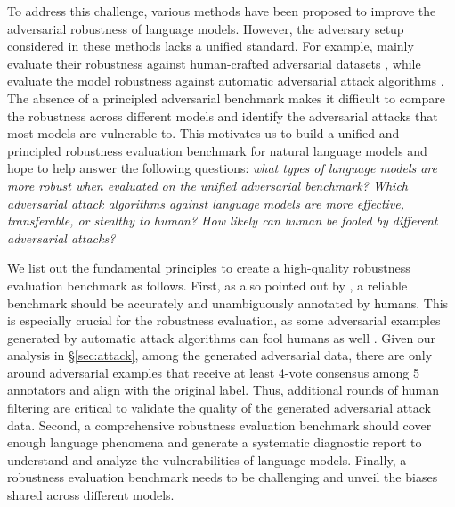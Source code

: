 \documentclass{article}
\newcommand{\m}[1]{{\textcolor{black}{{#1}}}}
\begin{document}
To address this challenge, various methods \citep{smart,freelb,wang2021infobert,alum} have been proposed to improve the adversarial robustness of language models. 
However, the adversary setup considered in these methods lacks a unified standard. 
For example, \citet{smart, alum} mainly evaluate their robustness against human-crafted adversarial datasets \citep{anli,advsquad}, while \citet{wang2021infobert}  evaluate the model robustness  against automatic adversarial attack algorithms \citep{textfooler}.  
The absence of a principled adversarial benchmark makes it difficult to compare the 
robustness across different models and identify the adversarial attacks that most models are  vulnerable to.
This motivates us to build a unified and principled robustness evaluation benchmark for natural language models and hope to help answer the following questions:\textit{ what types of language models are more robust when evaluated on the unified adversarial benchmark? Which adversarial attack algorithms against language models are more effective, transferable, or stealthy to human? How likely can human be fooled by different adversarial attacks?
}

We list out the fundamental principles to create a high-quality robustness evaluation benchmark as follows. 
First, as also pointed out by \citep{criteria}, a reliable benchmark should be accurately and unambiguously annotated by \m{humans}. 
This is especially crucial for the robustness evaluation, as some adversarial examples generated by automatic attack algorithms can fool humans as well \citep{morris-etal-2020-reevaluating}. Given our analysis in \S \ref{sec:attack}, among the generated adversarial data, there are only around  adversarial examples that receive at least 4-vote consensus among 5 annotators and align with the original label. 
Thus, additional rounds of human filtering are critical to validate the quality of the generated adversarial attack data. 
Second, a comprehensive robustness evaluation benchmark should cover enough language phenomena and generate a systematic diagnostic report to understand and analyze the vulnerabilities of language models. 
Finally, a robustness evaluation benchmark needs to be challenging and unveil the biases shared across different models.
\end{document}
